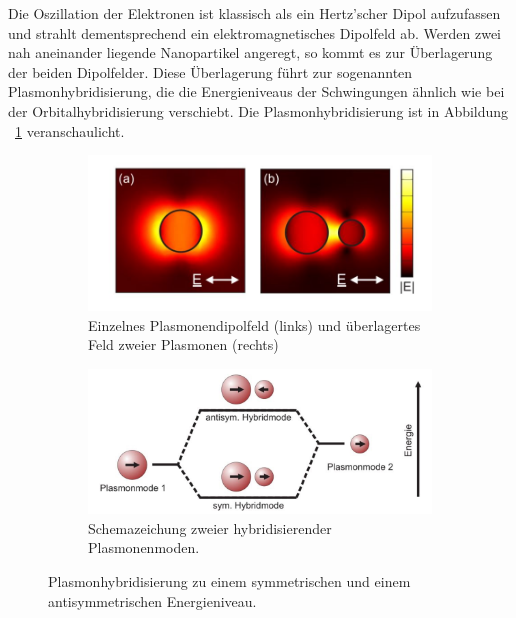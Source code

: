 Die Oszillation der Elektronen ist klassisch als ein Hertz'scher Dipol aufzufassen und strahlt dementsprechend ein elektromagnetisches Dipolfeld ab.
Werden zwei nah aneinander liegende Nanopartikel angeregt, so kommt es zur Überlagerung der beiden Dipolfelder. Diese Überlagerung führt zur sogenannten Plasmonhybridisierung, die die Energieniveaus der Schwingungen ähnlich wie bei der Orbitalhybridisierung verschiebt. Die Plasmonhybridisierung ist in Abbildung ~\ref{fig:hybrid} veranschaulicht. \cite{bayreuth}
\begin{figure}[H]
  \centering
  \begin{subfigure}{0.49\textwidth}
    \includegraphics[width=\textwidth]{plots/hybrid.jpg}
    \caption{Einzelnes Plasmonendipolfeld (links) und überlagertes Feld zweier Plasmonen (rechts)}
  \end{subfigure}
  \begin{subfigure}{0.49\textwidth}
    \includegraphics[width=\textwidth]{plots/hybridschema.jpg}
    \caption{Schemazeichung zweier hybridisierender Plasmonenmoden.}
  \end{subfigure}
  \caption{Plasmonhybridisierung zu einem symmetrischen und einem antisymmetrischen Energieniveau. \cite{bayreuth}}
  \label{fig:hybrid}
\end{figure}

